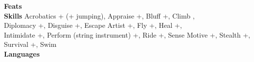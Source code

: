 \textbf{Feats} \feats \\
\textbf{Skills} Acrobatics +\acrobaticsskill \hspace{1pt} (+\jumpskill \hspace{1pt} jumping), Appraise +\appraiseskill, Bluff +\bluffskill, Climb \enhancedstat{\climbskill}, \\ Diplomacy +\diplomacyskill, Disguise +\disguiseskill, Escape Artist +\escapeartistskill, Fly +\flyskill, Heal +\healskill, \\ Intimidate +\intimidateskill, Perform (string instrument) +\performstringinstrumentskill, Ride +\rideskill, Sense Motive +\sensemotiveskill, Stealth +\stealthskill, Survival +\survivalskill, Swim \enhancedstat{\swimskill} \\
\textbf{Languages} \allylanguages \\

\newpage
